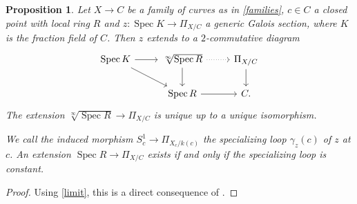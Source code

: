 \documentclass[11pt]{amsart}
\theoremstyle{plain}
\newtheorem{theorem}{Theorem}
\newtheorem{proposition}[theorem]{Proposition}
\theoremstyle{definition}
\newcommand{\on}{\operatorname}
\newcommand{\1}{\mathbb{1}}
\newcommand{\hz}{\hat{\mathbb{Z}}}
\newcommand{\mc}{\mathcal}
\newcommand{\spec}{\on{Spec}}
\newcommand{\Z}{\mathbb{Z}}
\renewcommand{\projlim}{\varprojlim}
\renewcommand{\hat}{\widehat}
\begin{document}
\begin{proposition}\label{prorootval}
	Let $X\to C$ be a family of curves as in \autoref{families}, $c\in C$ a closed point with local ring $R$ and $z:\spec K\to\Pi_{X/C}$ a generic Galois section, where $K$ is the fraction field of $C$. Then $z$ extends to a $2$-commutative diagram
	\[\begin{tikzcd}
		\spec K\rar\ar[dr]		&	\sqrt[\infty]{\spec R}\rar[dotted]\dar	&	\Pi_{X/C}\dar	\\
								&	\spec R\rar												&	C.
	\end{tikzcd}\]
	The extension $\sqrt[\infty]{\spec R}\to\Pi_{X/C}$ is unique up to a unique isomorphism. 
	
	We call the induced morphism $S^{1}_{c}\to\Pi_{X_{c}/k(c)}$ the specializing loop $\gamma_{z}(c)$ of $z$ at $c$. An extension $\spec R\to\Pi_{X/C}$ exists if and only if the specializing loop is constant.
\end{proposition}

\begin{proof}
	Using \autoref{limit}, this is a direct consequence of \cite[Theorem 3.1]{giulio-angelo-valuative}.
\end{proof}




\end{document}
